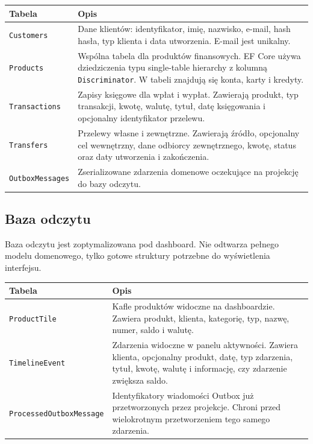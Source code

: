 \documentclass[12pt,a4paper]{article}
\begin{document}
\begin{longtable}{p{}p{}}
\toprule
\textbf{Tabela} & \textbf{Opis} \\
\midrule
\endhead
\texttt{Customers} & Dane klientów: identyfikator, imię, nazwisko, e-mail, hash hasła, typ klienta i data utworzenia. E-mail jest unikalny. \\
\texttt{Products} & Wspólna tabela dla produktów finansowych. EF Core używa dziedziczenia typu single-table hierarchy z kolumną \texttt{Discriminator}. W tabeli znajdują się konta, karty i kredyty. \\
\texttt{Transactions} & Zapisy księgowe dla wpłat i wypłat. Zawierają produkt, typ transakcji, kwotę, walutę, tytuł, datę księgowania i opcjonalny identyfikator przelewu. \\
\texttt{Transfers} & Przelewy własne i zewnętrzne. Zawierają źródło, opcjonalny cel wewnętrzny, dane odbiorcy zewnętrznego, kwotę, status oraz daty utworzenia i zakończenia. \\
\texttt{OutboxMessages} & Zserializowane zdarzenia domenowe oczekujące na projekcję do bazy odczytu. \\
\bottomrule
\end{longtable}

\subsection{Baza odczytu}

Baza odczytu jest zoptymalizowana pod dashboard. Nie odtwarza pełnego modelu domenowego, tylko gotowe struktury potrzebne do wyświetlenia interfejsu.

\begin{longtable}{p{}p{}}
\toprule
\textbf{Tabela} & \textbf{Opis} \\
\midrule
\endhead
\texttt{ProductTile} & Kafle produktów widoczne na dashboardzie. Zawiera produkt, klienta, kategorię, typ, nazwę, numer, saldo i walutę. \\
\texttt{TimelineEvent} & Zdarzenia widoczne w panelu aktywności. Zawiera klienta, opcjonalny produkt, datę, typ zdarzenia, tytuł, kwotę, walutę i informację, czy zdarzenie zwiększa saldo. \\
\texttt{ProcessedOutboxMessage} & Identyfikatory wiadomości Outbox już przetworzonych przez projekcje. Chroni przed wielokrotnym przetworzeniem tego samego zdarzenia. \\
\bottomrule
\end{longtable}
\end{document}

